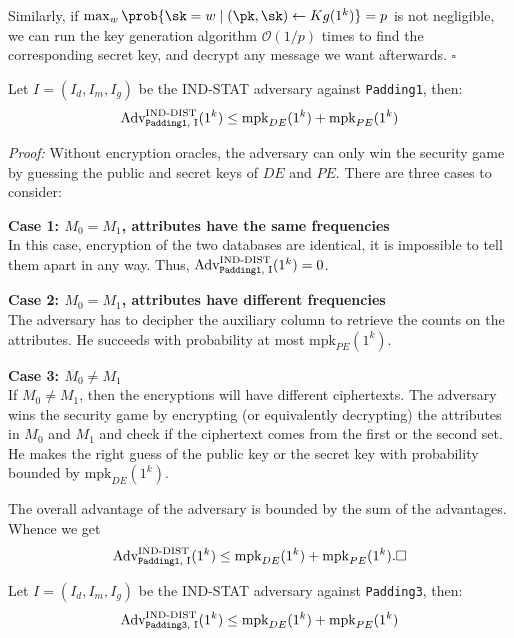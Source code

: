 Similarly, if $\max_{w} \prob{\sk = w \mid (\pk, \sk) \gets Kg(1^k)} = p$ is not negligible, we can run the key generation algorithm $\mathcal{O}(1/p)$ times to find the corresponding secret key, and decrypt any message we want afterwards. $\square$


\begin{theorem} \label{thm IND-STAT 1}
Let $I = (I_d, I_m, I_g)$ be the IND-STAT adversary against \texttt{Padding1}, then:
\begin{equation}
	\text{Adv}_{\text{\texttt{Padding1}, I}}^{\text{IND-DIST}}(1^k) \leq \text{mpk}_{DE}(1^k) + \text{mpk}_{PE}(1^k)
\end{equation}	
\end{theorem}

\textit{Proof:} Without encryption oracles, the adversary can only win the security game by guessing the public and secret keys of $DE$ and $PE$. There are three cases to consider:

\textbf{Case 1: $M_0 = M_1$, attributes have the same frequencies} \\
In this case, encryption of the two databases are identical, it is impossible to tell them apart in any way. Thus, $\text{Adv}_{\text{\texttt{Padding1}, I}}^{\text{IND-DIST}}(1^k) = 0$.

\textbf{Case 2: $M_0 = M_1$, attributes have different frequencies} \\
The adversary has to decipher the auxiliary column to retrieve the counts on the attributes. He succeeds with probability at most $\text{mpk}_{PE}(1^k)$.

\textbf{Case 3: $M_0 \neq M_1$} \\
If $M_0 \neq M_1$, then the encryptions will have different ciphertexts. The adversary wins the security game by encrypting (or equivalently decrypting) the attributes in $M_0$ and $M_1$ and check if the ciphertext comes from the first or the second set. He makes the right guess of the public key or the secret key with probability bounded by $\text{mpk}_{DE}(1^k)$.

The overall advantage of the adversary is bounded by the sum of the advantages. Whence we get
\begin{equation*}
\text{Adv}_{\text{\texttt{Padding1}, I}}^{\text{IND-DIST}}(1^k) \leq \text{mpk}_{DE}(1^k) + \text{mpk}_{PE}(1^k). \square
\end{equation*}


\begin{theorem}
	Let $I = (I_d, I_m, I_g)$ be the IND-STAT adversary against \texttt{Padding3}, then:
	\begin{equation}
	\text{Adv}_{\text{\texttt{Padding3}, I}}^{\text{IND-DIST}}(1^k) \leq \text{mpk}_{DE}(1^k) + \text{mpk}_{PE}(1^k)
	\end{equation}	
\end{theorem}

